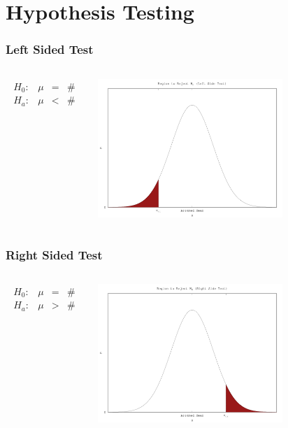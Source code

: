 \section{Hypothesis Testing}

\begin{frame}
  \frametitle{Left Sided Test}

  \begin{columns}
    \begin{eqnarray*}
      \begin{array}{lrcl}
        H_0: & \mu & = & \# \\
        H_a: & \mu & < & \#
      \end{array}
    \end{eqnarray*}


    \includegraphics[width=7cm]{img/leftSideHypothesisTest}

  \end{columns}

\end{frame}

\begin{frame}
  \frametitle{Right Sided Test}

  \begin{columns}
    \begin{eqnarray*}
      \begin{array}{lrcl}
        H_0: & \mu & = & \# \\
        H_a: & \mu & > & \#
      \end{array}
    \end{eqnarray*}


    \includegraphics[width=7cm]{img/rightSideHypothesisTest}

  \end{columns}

\end{frame}


